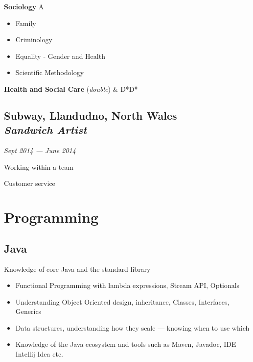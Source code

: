 \documentclass[a4paper, 13pt, draft]{article}
\newcommand{\timeperiod}[2]{%
    \textit{\small{#1 --- #2}}
}
\newcommand{\proglang}[1]{%
    \subsection*{#1}
}
\begin{document}
\begin{multicols}{2}
\textbf{Sociology} A

\begin{itemize}		
    \setlength\itemsep{0em}
\item Family
\item Criminology
\item Equality - Gender and Health
\item Scientific Methodology
\end{itemize}		

\textbf{Health and Social Care} (\textit{double}) & D*D*

\end{multicols}

\subsection*{Subway, \small{Llandudno, North Wales} \\\emph{Sandwich Artist}} \timeperiod{Sept 2014}{June 2014}

\begin{itemize}		
    \begin{multicols}{3}
    \item Working within a team
    \item Customer service
    \end{multicols}
\end{itemize}		

\section*{\color{col1} \Large{Programming} \color{default}} 

\proglang{Java}

Knowledge of core Java and the standard library

\begin{itemize}
    \setlength\itemsep{0em}
\item
    Functional Programming with lambda expressions, Stream API, Optionals
\item
    Understanding Object Oriented design, inheritance, Classes,
    Interfaces, Generics
\item
    Data structures, understanding how they scale --- knowing when to use which
\item
    Knowledge of the Java ecosystem and tools such as Maven, Javadoc, IDE
    Intellij Idea etc. 
\end{itemize}

\pagebreak
\end{document}
